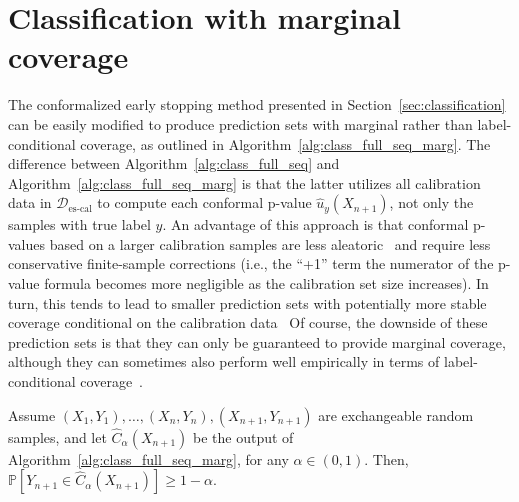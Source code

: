 \section{Classification with marginal coverage} \label{app:class-marg}

The conformalized early stopping method presented in Section~\ref{sec:classification} can be easily modified to produce prediction sets with marginal rather than label-conditional coverage, as outlined in Algorithm~\ref{alg:class_full_seq_marg}.
The difference between Algorithm~\ref{alg:class_full_seq}  and Algorithm~\ref{alg:class_full_seq_marg} is that the latter utilizes all calibration data in $\mathcal{D}_{\text{es-cal}}$ to compute each conformal p-value $\hat{u}_y(X_{n+1})$, not only the samples with true label $y$.
An advantage of this approach is that conformal p-values based on a larger calibration samples are less aleatoric~\cite{bates2021testing} and require less conservative finite-sample corrections (i.e., the ``+1'' term the numerator of the p-value formula becomes more negligible as the calibration set size increases).
In turn, this tends to lead to smaller prediction sets with potentially more stable coverage conditional on the calibration data~\cite{sesia2020comparison,bates2021testing}
Of course, the downside of these prediction sets is that they can only be guaranteed to provide marginal coverage, although they can sometimes also perform well empirically in terms of label-conditional coverage~\cite{romano2020classification}.

\begin{theorem} \label{thm:class_full_marg}
Assume $(X_{1},Y_{1}), \ldots, (X_{n},Y_{n}), (X_{n+1},Y_{n+1})$ are exchangeable random samples, and let $\hat{C}_{\alpha}(X_{n+1})$ be the output of Algorithm~\ref{alg:class_full_seq_marg}, for any $\alpha \in (0,1)$. 
Then, $\mathbb{P}[Y_{n+1} \in \hat{C}_{\alpha}(X_{n+1})] \geq 1-\alpha$.
\end{theorem}

